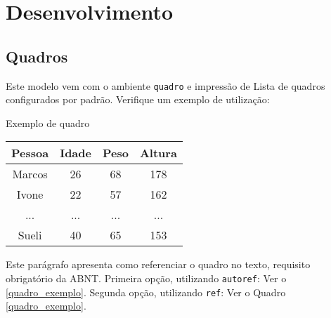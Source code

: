 \chapter{Desenvolvimento}

\section{Quadros}

Este modelo vem com o ambiente \texttt{quadro} e impressão de Lista de quadros 
configurados por padrão. Verifique um exemplo de utilização:

\begin{quadro}[htb]
    \caption{\label{quadro_exemplo}Exemplo de quadro}
    \begin{tabular}{|c|c|c|c|}
        \hline
        \textbf{Pessoa} & \textbf{Idade} & \textbf{Peso} & \textbf{Altura} \\ \hline
        Marcos & 26    & 68   & 178    \\ \hline
        Ivone  & 22    & 57   & 162    \\ \hline
        ...    & ...   & ...  & ...    \\ \hline
        Sueli  & 40    & 65   & 153    \\ \hline
    \end{tabular}
\end{quadro}

Este parágrafo apresenta como referenciar o quadro no texto, requisito
obrigatório da ABNT. 
Primeira opção, utilizando \texttt{autoref}: Ver o \autoref{quadro_exemplo}. 
Segunda opção, utilizando  \texttt{ref}: Ver o Quadro \ref{quadro_exemplo}.